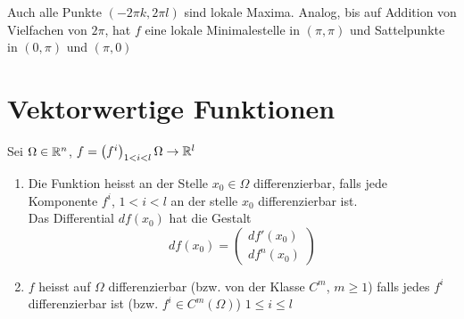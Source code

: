 \begin{enumerate}
Auch alle Punkte $\left( -2\pi k,2\pi l\right)$ sind lokale Maxima. Analog, bis auf Addition von Vielfachen von $2\pi$, hat $f$ eine lokale Minimalestelle in $\left( \pi,\pi\right)$ und Sattelpunkte in $\left( 0,\pi\right)$ und $\left( \pi,0\right)$
\end{enumerate}

\section{Vektorwertige Funktionen}
Sei $\Omega\in\mathbb{R}^n$, $f=\left( f^i\right)_{1 < i < l}\Omega\to\mathbb{R}^l$
\begin{definition}{8.57}
\begin{enumerate}
\item Die Funktion  heisst an der Stelle $x_0\in\Omega$ differenzierbar, falls jede Komponente $f^i$, $1 < i < l$ an der stelle $x_0$ differenzierbar ist.\\

Das Differential $df\left( x_0\right)$ hat die Gestalt \[df\left( {{x_0}} \right) = \left( {\begin{array}{*{20}{c}}
{df'\left( {{x_0}} \right)}\\
{d{f^n}\left( {{x_0}} \right)}
\end{array}} \right)\]
\item $f$ heisst auf $\Omega$ differenzierbar (bzw. von der Klasse $C^m$, $m\geq 1$) falls jedes $f^i$ differenzierbar ist (bzw. $f^i\in C^m\left( \Omega\right)$) $1\leq i \leq l$
\end{enumerate}
\end{definition}
